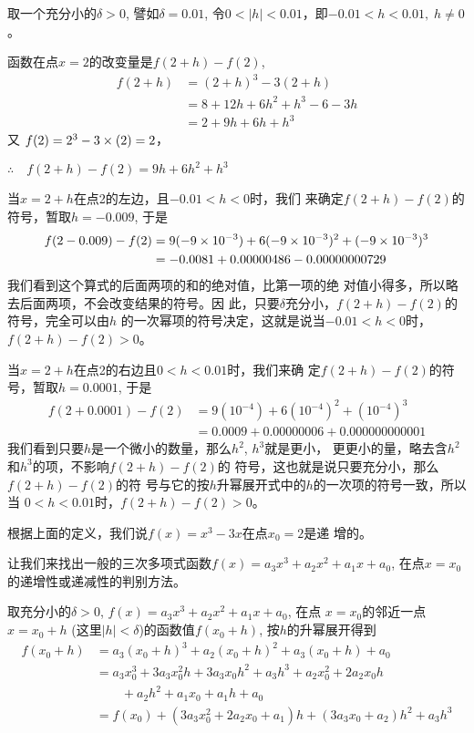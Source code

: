 \begin{solution}
    取一个充分小的$\delta>0$, 譬如$\delta=0.01$, 令$0<|h|<0.01$，即$-0.01<h<0.01,\; h\ne 0$。

    函数在点$x=2$的改变量是$f(2+h)-f(2)$,
\[\begin{split}
    f(2+h)&=(2 +h)^3-3(2+h)\\
  &  =8+12h+6h^2+h^3-6-3h\\
   & =2+9h+6h+h^3
\end{split} \]   
    又
  $  f(2)=2^3-3\times(2)=2$，


$\therefore\quad f(2+h)-f(2)=9h+6h^2+h^3$

    当$x=2+h$在点2的左边，且$-0.01<h<0$时，我们
    来确定$f(2+h)-f(2)$的符号，暂取$h=-0.009$, 于是
\[\begin{split}
      f(2-0.009)-f(2)&=9(-9\times10^{-3})+6(-9\times10^{-3})^2+(-9\times10^{-3})^3\\
 &   =-0.0081+0.00000486-0.00000000729  
\end{split}\]
    我们看到这个算式的后面两项的和的绝对值，比第一项的绝
    对值小得多，所以略去后面两项，不会改变结果的符号。因
    此，只要$\delta$充分小，$f(2+h)-f(2)$的符号，完全可以由$h$
    的一次幂项的符号决定，这就是说当$-0.01<h<0$时，$f(2+h)-f(2)>0$。

    当$x=2+h$在点2的右边且$0<h<0.01$时，我们来确
    定$f(2+h)-f(2)$的符号，暂取$h=0.0001$, 于是
\[\begin{split}
    f(2+0.0001)-f(2)&=9(10^{-4})+6(10^{-4})^2+(10^{-4})^3\\
  &  =0.0009+0.00000006+0.000000000001
\end{split}\]
    我们看到只要$h$是一个微小的数量，那么$h^2$, $h^3$就是更小，
    更更小的量，略去含$h^2$和$h^3$的项，不影响$f(2+h)-f(2)$的
    符号，这也就是说只要充分小，那么$f(2+h)-f(2)$的符
    号与它的按$h$升幂展开式中的$h$的一次项的符号一致，所以当
    $0<h<0.01$时，$f(2+h)-f(2)>0$。

    根据上面的定义，我们说$f(x)=x^3-3x$在点$x_0=2$是递
增的。
\end{solution}

让我们来找出一般的三次多项式函数$f(x)=a_3x^3+a_2x^2
+a_1x+a_0$, 在点$x=x_0$的递增性或递减性的判别方法。

取充分小的$\delta>0$, $f(x)=a_3x^3+a_2x^2
+a_1x+a_0$, 在点
$x=x_0$的邻近一点$x=x_0+h$ (这里$|h|<\delta$)的函数值$f(x_0+h)$, 
按$h$的升幂展开得到
\[\begin{split}
    f(x_0+h) &= a_3 (x_0 +h)^3 +a_2(x_0 +h)^2 + a_3 (x_0 +h) + a_0\\
&=a_3x_0^3+3a_3x_0^2h+3a_3x_0h^2+a_3h^3+a_2x_0^2+2a_2x_0h\\
&\qquad +a_2h^2+a_1x_0+a_1h+a_0\\
&=f(x_0)+(3a_3x_0^2+2a_2x_0+a_1)h+(3a_3x_0+
a_2)h^2+a_3h^3
\end{split}\]

